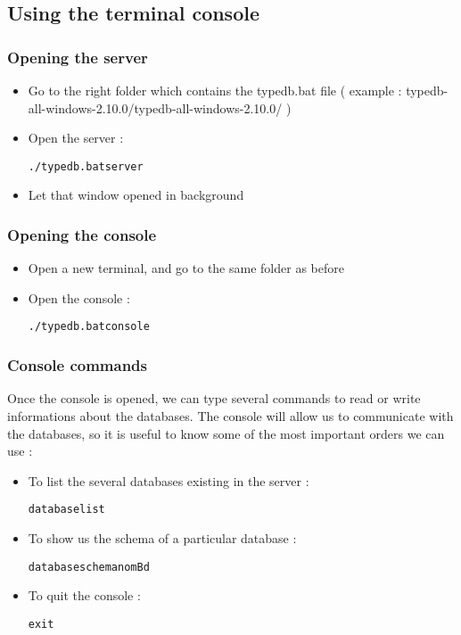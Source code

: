 \documentclass[runningheads]{llncs}
\begin{document}
\subsection{Using the terminal console}


\subsubsection{Opening the server}

\begin{itemize}
\item Go to the right folder which contains the typedb.bat file ( example : typedb-all-windows-2.10.0/typedb-all-windows-2.10.0/ )
\item Open the server : \begin{alltt}./typedb.bat server \end{alltt}
\item Let that window opened in background
\end{itemize}

\subsubsection{Opening the console}
\begin{itemize}
\item Open a new terminal, and go to the same folder as before
\item Open the console :   \begin{alltt}./typedb.bat console\end{alltt}     
\end{itemize}

\subsubsection{Console commands}

Once the console is opened, we can type several commands to read or write informations about the databases. The console will allow us to communicate with the databases, so it is useful to know some of the most important orders we can use :

\begin{itemize}
\item To list the several databases existing in the server :    \begin{alltt}database list\end{alltt}       
\item To show us the schema of a particular database :    \begin{alltt}database schema nomBd\end{alltt}       
\item To quit the console :                        \begin{alltt}exit\end{alltt}  
\end{itemize}
\end{document}
